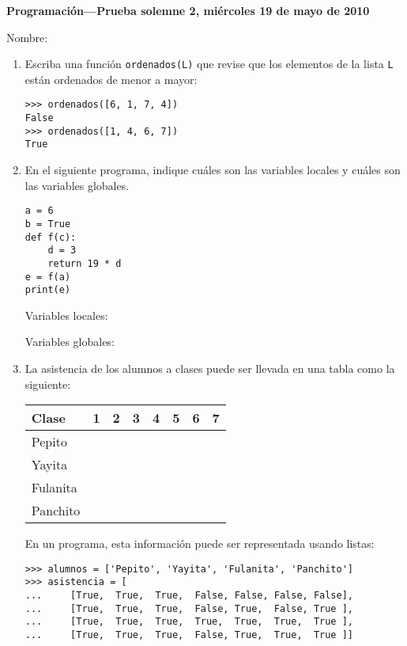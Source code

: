 \documentclass[10pt,spanish]{article}
\newcommand{\onelinerule}{\rule[2.3ex]{0pt}{0pt}}
\newcommand{\nombre}{\framebox[0.8\textwidth]{\onelinerule}}
\newcommand{\T}{\ding{51}}
\newcommand{\F}{}
\begin{document}
  \thispagestyle{empty}
  \pagestyle{empty}
  {\Large\bfseries Programación---Prueba solemne 2, miércoles 19 de mayo de 2010}

  Nombre: \nombre

  \begin{enumerate}
    \item
      Escriba una función \lstinline+ordenados(L)+
      que revise que los elementos de la lista \verb+L+
      están ordenados de menor a mayor:
      \begin{lstlisting}
>>> ordenados([6, 1, 7, 4])
False
>>> ordenados([1, 4, 6, 7])
True
      \end{lstlisting}

      \framebox[\textwidth]{\rule[20.0ex]{0pt}{0pt}}

    \item
      En el siguiente programa,
      indique cuáles son las variables locales
      y cuáles son las variables globales.
      \begin{minipage}{5em}
          \begin{lstlisting}
a = 6
b = True
def f(c):
    d = 3
    return 19 * d
e = f(a)
print(e)
          \end{lstlisting}
      \end{minipage}

      Variables locales:

      \framebox[\textwidth]{\rule[5.0ex]{0pt}{0pt}}

      Variables globales:

      \framebox[\textwidth]{\rule[5.0ex]{0pt}{0pt}}
    \newpage
    \item
      La asistencia de los alumnos a clases
      puede ser llevada en una tabla como la siguiente:

      \begin{tabular}{|l|c|c|c|c|c|c|c|}\hline
        Clase    & 1& 2& 3& 4& 5& 6& 7\\\hline\hline
        Pepito   &\T&\T&\T&\F&\F&\F&\F\\\hline
        Yayita   &\T&\T&\T&\F&\T&\F&\T\\\hline
        Fulanita &\T&\T&\T&\T&\T&\T&\T\\\hline
        Panchito &\T&\T&\T&\F&\T&\T&\T\\\hline
      \end{tabular}

      En un programa,
      esta información puede ser representada
      usando listas:
      \begin{lstlisting}
>>> alumnos = ['Pepito', 'Yayita', 'Fulanita', 'Panchito']
>>> asistencia = [
...     [True,  True,  True,  False, False, False, False],
...     [True,  True,  True,  False, True,  False, True ],
...     [True,  True,  True,  True,  True,  True,  True ],
...     [True,  True,  True,  False, True,  True,  True ]]
      \end{lstlisting}


\end{enumerate}
\end{document}
